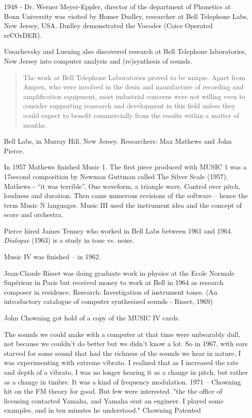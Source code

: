 1948 - Dr. Werner Meyer-Eppler, director of the department of Phonetics at Bonn University was visited by Homer Dudley, researcher at Bell Telephone Labs, New Jersey, USA. Dudley demonstrated the Vocoder (Coice Operated reCOrDER).

Ussachevsky and Luening also discovered research at Bell Telephone laboratories, New Jersey into computer analysis and (re)synthesis of sounds.

\begin{quotation}
The work at Bell Telephone Laboratories proved to be unique. Apart from Ampex, who were involved in the desin and manufacture of recording and amplification equipment, most industrial concerns were not willing even to consider supporting reasearch and development in this field unless they could expect to benefit commercially from the results within a matter of months. \citep[94]{manning2013electronic}
\end{quotation}


Bell Labs, in Murray Hill, New Jersey. Researchers: Max Mathews and John Pierce.

In 1957 Mathews finished Music 1. The first piece produced with MUSIC 1 was a 17second composition by Newman Guttman called The Silver Scale (1957). Mathews - ``it was terrible''. One waveform, a triangle wave. Control over pitch, loudness and duration. Then came numerous revisions of the software – hence the term Music N languages. Music III used the instrument idea and the concept of score and orchestra.

Pierce hired James Tenney who worked in Bell Labs between 1961 and 1964. \textit{Dialogue} (1963) is a study in tone vs. noise.

Music IV was finished – in 1962.

Jean-Claude Risset was doing graduate work in physics at the Ecole Normale Sup\'erieur in Paris but received money to work at Bell in 1964 as research composer in residence. Research: Investigation of instrument tones. (An introductory catalogue of computer synthesized sounds - Risset, 1969)

John Chowning got hold of a copy of the MUSIC IV cards.

The sounds we could make with a computer at that time were unbearably dull, not because we couldn't do better but we didn't know a lot. So in 1967, with ears starved for some sound that had the richness of the sounds we hear in nature, I was experimenting with extreme vibrato. I realized that as I increased the rate and depth of a vibrato, I was no longer hearing it as a change in pitch, but rather as a change in timbre. It was a kind of frequency modulation.
1971 – Chowning hit on the FM theory for good. But few were interested. "the the office of licensing contacted Yamaha, and Yamaha sent an engineer. I played some examples, and in ten minutes he understood." Chowning Patented

